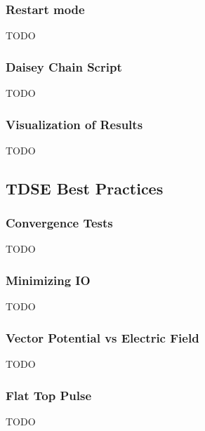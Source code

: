 \documentclass{article}
\begin{document}
\subsubsection{Restart mode} %
\label{ssub:restart_mode}
TODO

\subsubsection{Daisey Chain Script} %
\label{ssub:daisey_chain_script}
TODO

\subsubsection{Visualization of Results} %
\label{ssub:visualization_of_results}
TODO


\subsection{TDSE Best Practices} %
\label{sub:tdse_best_practices}

\subsubsection{Convergence Tests} %
\label{ssub:convergence_tests}
TODO

\subsubsection{Minimizing IO} %
\label{ssub:minimizing_io}
TODO

\subsubsection{Vector Potential vs Electric Field} %
\label{ssub:vector_potential_vs_electric_field}
TODO

\subsubsection{Flat Top Pulse} %
\label{ssub:flat_top_pulse}
TODO
\end{document}
